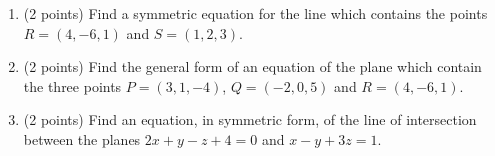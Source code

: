 \documentclass[11pt]{article}
\begin{document}
\begin{enumerate}
    \item (2 points) Find a symmetric equation for the line which contains the points \(R = (4,-6,1)\) and \(S = (1,2,3)\).
    \item (2 points) Find the general form of an equation of the plane which contain the three points \(P = (3,1,-4)\), \(Q = (-2,0,5)\) and \(R = (4,-6,1)\).
    \item (2 points) Find an equation, in symmetric form, of the line of intersection between the planes \(2x + y - z + 4 = 0\) and \(x - y + 3z = 1\).
\end{enumerate}
\end{document}
